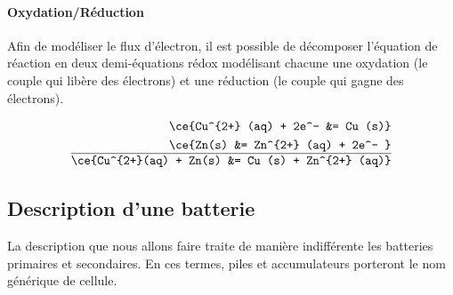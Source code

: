 

\paragraph*{Oxydation/Réduction}

Afin de modéliser le flux d'électron, il est possible de décomposer l'équation de réaction en deux demi-équations rédox modélisant chacune une oxydation (le couple qui libère des électrons) et une réduction (le couple qui gagne des électrons).
\begin{center}
\begin{minipage}{0.4\textwidth}
\begin{align*}
    \ce{Cu^{2+} (aq) + 2e^- &= Cu (s)}\\
    \ce{Zn(s) &= Zn^{2+} (aq) + 2e^- } \\
    \hline
    \ce{Cu^{2+}(aq)  + Zn(s) &= Cu (s) + Zn^{2+} (aq)} 
\end{align*}
\end{minipage}    
\end{center}



\subsection{Description d'une batterie}
La description que nous allons faire traite de manière indifférente les batteries primaires et secondaires. En ces termes, piles et accumulateurs porteront le nom générique de cellule.

